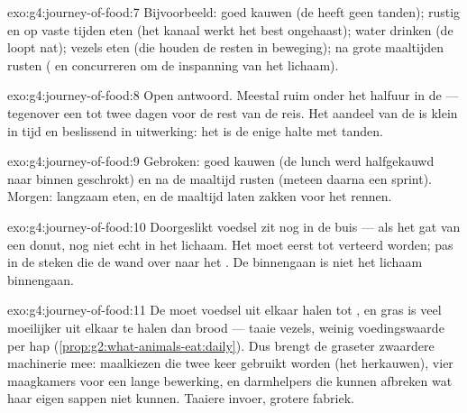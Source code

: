 \begin{solution}{exo:g4:journey-of-food:7}
Bijvoorbeeld: goed kauwen (de  heeft geen tanden); rustig en op
vaste tijden eten (het kanaal werkt het best ongehaast); water drinken
(de  loopt nat); vezels eten (die houden de resten in
beweging); na grote maaltijden rusten ( en  concurreren om de
inspanning van het lichaam).
\end{solution}

\begin{solution}{exo:g4:journey-of-food:8}
Open antwoord. Meestal ruim onder het halfuur in de  --- tegenover
een tot twee dagen voor de rest van de reis. Het aandeel van de  is
klein in tijd en beslissend in uitwerking: het is de enige halte met
tanden.
\end{solution}

\begin{solution}{exo:g4:journey-of-food:9}
Gebroken: goed kauwen (de lunch werd halfgekauwd naar binnen geschrokt)
en na de maaltijd rusten (meteen daarna een sprint). Morgen: langzaam
eten, en de maaltijd laten zakken voor het rennen.
\end{solution}

\begin{solution}{exo:g4:journey-of-food:10}
Doorgeslikt voedsel zit nog in de buis --- als het gat van een donut,
nog niet echt in het lichaam. Het moet eerst tot 
verteerd worden; pas in de  steken die de wand over naar het
. De  binnengaan is niet het lichaam binnengaan.
\end{solution}

\begin{solution}{exo:g4:journey-of-food:11}
De  moet voedsel uit elkaar halen tot , en gras
is veel moeilijker uit elkaar te halen dan brood --- taaie vezels,
weinig voedingswaarde per hap
(\cref{prop:g2:what-animals-eat:daily}). Dus brengt de graseter
zwaardere machinerie mee: maalkiezen die twee keer gebruikt worden (het
herkauwen), vier maagkamers voor een lange bewerking, en darmhelpers
die kunnen afbreken wat haar eigen sappen niet kunnen. Taaiere invoer,
grotere fabriek.
\end{solution}
